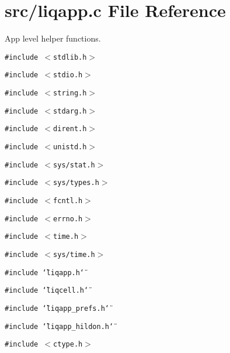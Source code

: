 \section{src/liqapp.c File Reference}
\label{d7/dbc/liqapp_8c}
App level helper functions.  


{\tt \#include $<$stdlib.h$>$}\par
{\tt \#include $<$stdio.h$>$}\par
{\tt \#include $<$string.h$>$}\par
{\tt \#include $<$stdarg.h$>$}\par
{\tt \#include $<$dirent.h$>$}\par
{\tt \#include $<$unistd.h$>$}\par
{\tt \#include $<$sys/stat.h$>$}\par
{\tt \#include $<$sys/types.h$>$}\par
{\tt \#include $<$fcntl.h$>$}\par
{\tt \#include $<$errno.h$>$}\par
{\tt \#include $<$time.h$>$}\par
{\tt \#include $<$sys/time.h$>$}\par
{\tt \#include \char`\"{}liqapp.h\char`\"{}}\par
{\tt \#include \char`\"{}liqcell.h\char`\"{}}\par
{\tt \#include \char`\"{}liqapp\_\-prefs.h\char`\"{}}\par
{\tt \#include \char`\"{}liqapp\_\-hildon.h\char`\"{}}\par
{\tt \#include $<$ctype.h$>$}\par
